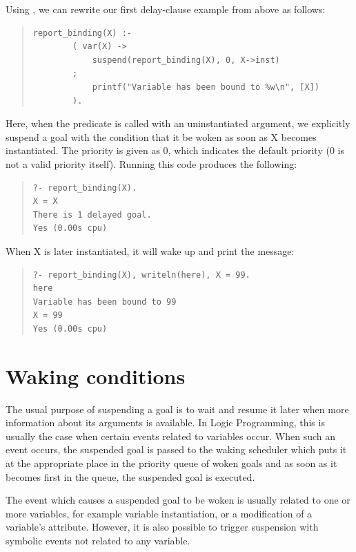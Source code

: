 {Using
,
we can rewrite our first delay-clause example from above as follows:
\begin{quote}
\begin{verbatim}
report_binding(X) :-
        ( var(X) ->
            suspend(report_binding(X), 0, X->inst)
        ;
            printf("Variable has been bound to %w\n", [X])
        ).
\end{verbatim}
\end{quote}
Here, when the predicate is called with an uninstantiated argument,
we explicitly suspend a goal with the condition that it be woken as
soon as X becomes instantiated. The priority is given as 0, which indicates
the default priority (0 is not a valid priority itself).
Running this code produces the following:
\begin{quote}
\begin{verbatim}
?- report_binding(X).
X = X
There is 1 delayed goal.
Yes (0.00s cpu)
\end{verbatim}
\end{quote}
When X is later instantiated, it will wake up and print the message:
\begin{quote}
\begin{verbatim}
?- report_binding(X), writeln(here), X = 99.
here
Variable has been bound to 99
X = 99
Yes (0.00s cpu)
\end{verbatim}
\end{quote}



\section{Waking conditions}
The usual purpose of suspending a goal is to wait and resume it later
when more information about its arguments is available.
In Logic Programming, this is usually the case when certain events
related to variables occur.
When such an event occurs, the suspended goal is passed to the
waking scheduler which puts it at the appropriate place
in the priority queue of woken goals and as soon as it becomes
first in the queue, the suspended goal is executed.

The event which causes a suspended goal to be woken is usually
related to one or more variables, for example
variable instantiation, or a modification of a variable's
attribute.
However, it is also possible to trigger suspension with symbolic events
not related to any variable.


}

